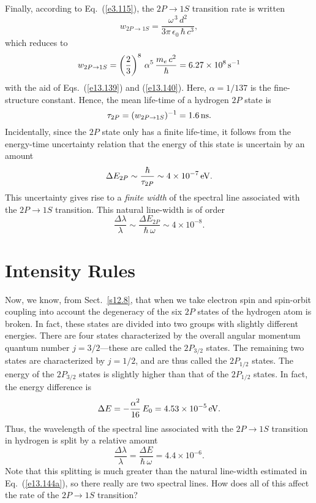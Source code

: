 Finally, according to Eq.~(\ref{e3.115}), the $2P\rightarrow 1S$ transition rate
is written
\begin{equation}
w_{2P\rightarrow 1S} = \frac{\omega^{\,3}\,d^2}{3\pi\,\epsilon_0\,\hbar\,c^3},
\end{equation}
which reduces to
\begin{equation}
w_{2P\rightarrow 1S} = \left(\frac{2}{3}\right)^8\,\alpha^5\,\frac{m_e\,c^2}{\hbar} = 6.27\times 10^8\,{\rm s}^{-1}
\end{equation}
with the aid of Eqs.~(\ref{e13.139}) and (\ref{e13.140}). Here, $\alpha=1/137$ is the fine-structure constant.
Hence, the mean
life-time of a hydrogen $2P$ state  is
\begin{equation}
\tau_{2P} = (w_{2P\rightarrow 1S})^{-1} = 1.6\,{\rm ns}.
\end{equation}
Incidentally, since the $2P$ state only has a finite life-time, it follows from the
energy-time uncertainty relation that the energy of this
state is uncertain by an amount
\begin{equation}
\Delta E_{2P} \sim \frac{\hbar}{\tau_{2P}}\sim 4\times 10^{-7}\,{\rm eV}.
\end{equation}
This uncertainty gives rise to a {\em finite width}\/ of the spectral
line associated with the $2P\rightarrow 1S$ transition. This natural
line-width is of order
\begin{equation}\label{e13.144a}
\frac{\Delta\lambda}{\lambda} \sim \frac{\Delta E_{2P}}{\hbar\,\omega}\sim 4 \times 10^{-8}.
\end{equation}

\section{Intensity Rules}
Now, we know, from Sect.~\ref{s12.8}, that when we take electron spin
and spin-orbit coupling into account the degeneracy of the six $2P$
states of the hydrogen atom is broken. In fact, these states are divided
into two groups with slightly different energies. There are four states
characterized by the overall angular momentum quantum number
$j=3/2$---these are called the $2P_{3/2}$ states. The remaining two
states are characterized by $j=1/2$, and are thus called the $2P_{1/2}$ states.
The energy of the $2P_{3/2}$ states is slightly higher than that of
the $2P_{1/2}$ states. In fact, the energy difference
is 
\begin{equation}
\Delta E = - \frac{\alpha^2}{16}\,E_0 = 4.53\times 10^{-5}\,{\rm eV}.
\end{equation}
Thus, the wavelength of the spectral line associated with the $2P\rightarrow 1S$ transition
in hydrogen is split by a relative amount
\begin{equation}
\frac{\Delta\lambda}{\lambda} = \frac{\Delta E}{\hbar\,\omega} = 
4.4\times 10^{-6}.
\end{equation}
Note that this splitting is much greater than the natural line-width estimated in Eq.~(\ref{e13.144a}), so there really are two spectral lines.
How does all of this affect the rate of the $2P\rightarrow 1S$ transition?

